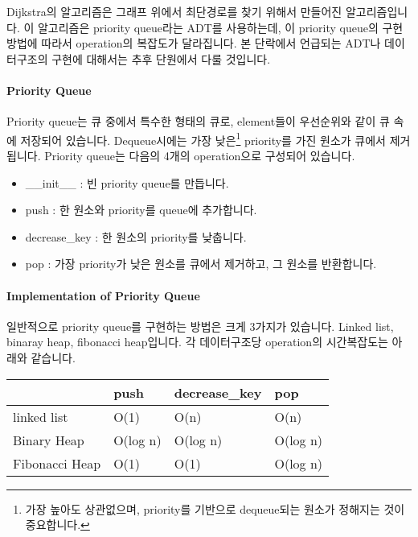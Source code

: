 \documentclass[titlepage]{report}
\begin{document}

Dijkstra의 알고리즘은 그래프 위에서 최단경로를 찾기 위해서 만들어진 알고리즘입니다. 이 알고리즘은 priority queue라는 ADT를 사용하는데, 이 priority queue의 구현 방법에 따라서 operation의 복잡도가 달라집니다. 본 단락에서 언급되는 ADT나 데이터구조의 구현에 대해서는 추후 단원에서 다룰 것입니다. 

\paragraph{Priority Queue} Priority queue는 큐 중에서 특수한 형태의 큐로, element들이 우선순위와 같이 큐 속에 저장되어 있습니다. Dequeue시에는 가장 낮은\footnote{가장 높아도 상관없으며, priority를 기반으로 dequeue되는 원소가 정해지는 것이 중요합니다.}  priority를 가진 원소가 큐에서 제거됩니다. Priority queue는 다음의 4개의 operation으로 구성되어 있습니다. 

\begin{itemize} 
\item \_\_init\_\_ : 빈 priority queue를 만듭니다. 
\item push : 한 원소와 priority를 queue에 추가합니다. 
\item decrease\_key : 한 원소의 priority를 낮춥니다. 
\item pop : 가장 priority가 낮은 원소를 큐에서 제거하고, 그 원소를 반환합니다. 
\end{itemize}

\paragraph{Implementation of Priority Queue} 

일반적으로 priority queue를 구현하는 방법은 크게 3가지가 있습니다. Linked list, binaray heap, fibonacci heap입니다. 각 데이터구조당 operation의 시간복잡도는 아래와 같습니다. 

\begin{table}[h]
\begin{tabular}{|l|l|l|l|}
\hline
               & push   & decrease\_key & pop \\ \hline
linked list    & O(1)     & O(n)          & O(n)         \\ \hline
Binary Heap    & O(log n) & O(log n)      & O(log n)     \\ \hline
Fibonacci Heap & O(1)     & O(1)          & O(log n)     \\ \hline
\end{tabular}
\end{table}
\end{document}
